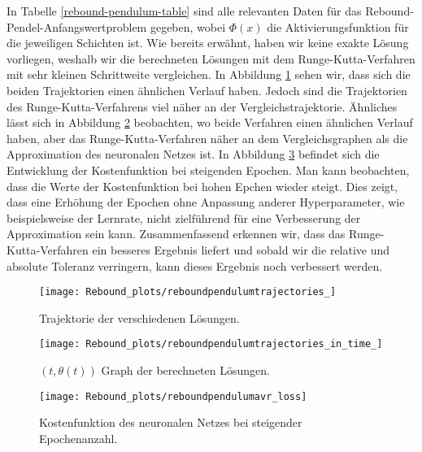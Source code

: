 In Tabelle \ref{rebound-pendulum-table} sind alle relevanten Daten für das Rebound-Pendel-Anfangswertproblem gegeben,
wobei $\Phi(x)$ die Aktivierungsfunktion für die jeweiligen Schichten ist. Wie bereits erwähnt, haben wir keine exakte
Lösung vorliegen, weshalb wir die berechneten Lösungen mit dem Runge-Kutta-Verfahren mit sehr kleinen Schrittweite
vergleichen. In Abbildung \ref{fig:rebound-trajectories} sehen wir, dass sich die beiden Trajektorien einen ähnlichen
Verlauf haben. Jedoch sind die Trajektorien des Runge-Kutta-Verfahrens viel näher an der Vergleichstrajektorie.
Ähnliches lässt sich in Abbildung \ref{fig:rebound-trajectories-in-time} beobachten, wo beide Verfahren einen ähnlichen
Verlauf haben, aber das Runge-Kutta-Verfahren näher an dem Vergleichsgraphen als die Approximation des neuronalen Netzes
ist. In Abbildung \ref{fig:rebound-loss} befindet sich die Entwicklung der Kostenfunktion bei steigenden Epochen. Man
kann beobachten, dass die Werte der Kostenfunktion bei hohen Epchen wieder steigt. Dies zeigt, dass eine Erhöhung der
Epochen ohne Anpassung anderer Hyperparameter, wie beispielsweise der Lernrate, nicht zielführend für eine Verbesserung
der Approximation sein kann. Zusammenfassend erkennen wir, dass das Runge-Kutta-Verfahren ein besseres Ergebnis liefert
und sobald wir die relative und absolute Toleranz verringern, kann dieses Ergebnis noch verbessert werden.

\begin{figure}
       \centering
       \texttt{[image: Rebound\_plots/reboundpendulumtrajectories\_]}
       \caption{Trajektorie der verschiedenen Lösungen.}
       \label{fig:rebound-trajectories}
\end{figure}

\begin{figure}
       \centering
       \texttt{[image: Rebound\_plots/reboundpendulumtrajectories\_in\_time\_]}
       \caption{$(t, \theta(t))$ Graph der berechneten Lösungen.}
       \label{fig:rebound-trajectories-in-time}
\end{figure}


\begin{figure}
       \centering
       \texttt{[image: Rebound\_plots/reboundpendulumavr\_loss]}
       \caption{Kostenfunktion des neuronalen Netzes bei steigender Epochenanzahl.}
       \label{fig:rebound-loss}
\end{figure}

